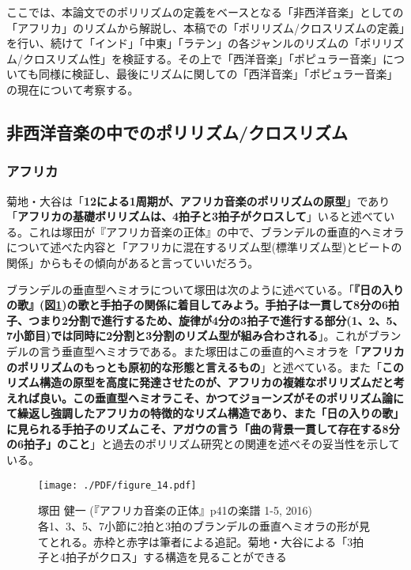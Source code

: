 \documentclass[uplatex,dvipdfmx]{ujarticle}
\begin{document}
ここでは、本論文でのポリリズムの定義をベースとなる「非西洋音楽」としての「アフリカ」のリズムから解説し、本稿での「ポリリズム/クロスリズムの定義」を行い、続けて「インド」「中東」「ラテン」の各ジャンルのリズムの「ポリリズム/クロスリズム性」を検証する。その上で「西洋音楽」「ポピュラー音楽」についても同様に検証し、最後にリズムに関しての「西洋音楽」「ポピュラー音楽」の現在について考察する。

\subsection{非西洋音楽の中でのポリリズム/クロスリズム}
\subsubsection{アフリカ}

菊地・大谷は「{\bf 12による1周期が、アフリカ音楽のポリリズムの原型}」\cite{kikuchi-ootani:01}であり「{\bf アフリカの基礎ボリリズムは、4拍子と3拍子がクロスして}」\cite{kikuchi-ootani:01}いると述べている。これは塚田が『アフリカ音楽の正体』の中で、ブランデルの垂直的ヘミオラについて述べた内容と「アフリカに混在するリズム型(標準リズム型)とビートの関係」からもその傾向があると言っていいだろう\cite{tsukada:01}。

ブランデルの垂直型ヘミオラについて塚田は次のように述べている。「{\bf 『日の入りの歌』(図\ref{fig:figure_14})の歌と手拍子の関係に着目してみよう。手拍子は一貫して8分の6拍子、つまり2分割で進行するため、旋律が4分の3拍子で進行する部分(1、2、5、7小節目)では同時に2分割と3分割のリズム型が組み合わされる}」\cite{tsukada:01}。これがブランデルの言う垂直型ヘミオラである。また塚田はこの垂直的ヘミオラを「{\bf アフリカのポリリズムのもっとも原初的な形態と言えるもの}」\cite{tsukada:01}と述べている。また「{\bf このリズム構造の原型を高度に発達させたのが、アフリカの複雑なポリリズムだと考えれば良い。この垂直型ヘミオラこそ、かつてジョーンズがそのポリリズム論にて繰返し強調したアフリカの特徴的なリズム構造であり、また「日の入りの歌」に見られる手拍子のリズムこそ、アガウの言う「曲の背景一貫して存在する8分の6拍子」のこと}」\cite{tsukada:01}と過去のポリリズム研究との関連を述べその妥当性を示している。

\begin{figure}[ht]
\centerline{
	\texttt{[image: ./PDF/figure\_14.pdf]}
}
\caption{塚田 健一 (『アフリカ音楽の正体』p41の楽譜 1-5, 2016)\\
各1、3、5、7小節に2拍と3拍のブランデルの垂直ヘミオラの形が見てとれる。赤枠と赤字は筆者による追記。菊地・大谷による「3拍子と4拍子がクロス」する構造を見ることができる}
\label{fig:figure_14}
\end{figure}
\end{document}
